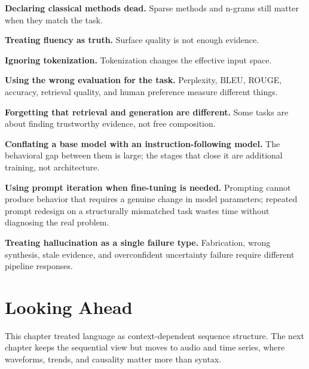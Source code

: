 \begin{mistakebox}
\item \textbf{Declaring classical methods dead.} Sparse methods and n-grams still matter when they match the task.
\item \textbf{Treating fluency as truth.} Surface quality is not enough evidence.
\item \textbf{Ignoring tokenization.} Tokenization changes the effective input space.
\item \textbf{Using the wrong evaluation for the task.} Perplexity, BLEU, ROUGE, accuracy, retrieval quality, and human preference measure different things.
\item \textbf{Forgetting that retrieval and generation are different.} Some tasks are about finding trustworthy evidence, not free composition.
\item \textbf{Conflating a base model with an instruction-following model.} The behavioral gap between them is large; the stages that close it are additional training, not architecture.
\item \textbf{Using prompt iteration when fine-tuning is needed.} Prompting cannot produce behavior that requires a genuine change in model parameters; repeated prompt redesign on a structurally mismatched task wastes time without diagnosing the real problem.
\item \textbf{Treating hallucination as a single failure type.} Fabrication, wrong synthesis, stale evidence, and overconfident uncertainty failure require different pipeline responses.
\end{mistakebox}

\section{Looking Ahead}

This chapter treated language as context-dependent sequence structure. The next chapter keeps the sequential view but moves to audio and time series, where waveforms, trends, and causality matter more than syntax.

